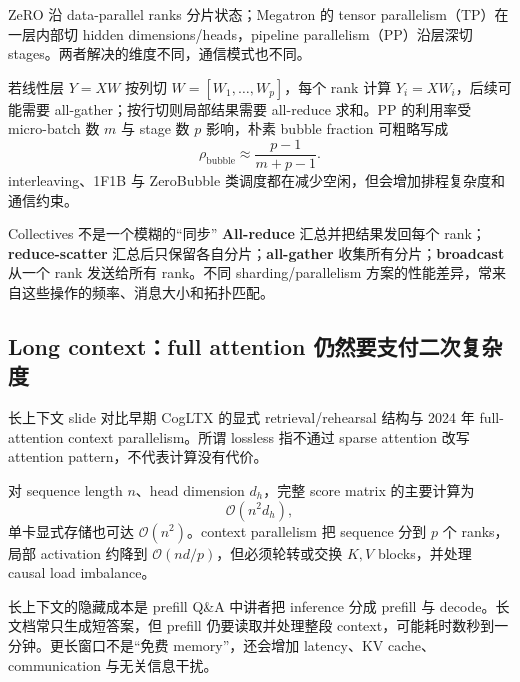 ZeRO 沿 data-parallel ranks 分片状态；Megatron 的 tensor parallelism（TP）在一层内部切 hidden dimensions/heads，pipeline parallelism（PP）沿层深切 stages。两者解决的维度不同，通信模式也不同。


若线性层 $Y=XW$ 按列切 $W=[W_1,\ldots,W_p]$，每个 rank 计算 $Y_i=XW_i$，后续可能需要 all-gather；按行切则局部结果需要 all-reduce 求和。PP 的利用率受 micro-batch 数 $m$ 与 stage 数 $p$ 影响，朴素 bubble fraction 可粗略写成
\[
\rho_{\text{bubble}}\approx \frac{p-1}{m+p-1}.
\]
interleaving、1F1B 与 ZeroBubble 类调度都在减少空闲，但会增加排程复杂度和通信约束。

\begin{knowledgebox}{Collectives 不是一个模糊的“同步”}
\textbf{All-reduce} 汇总并把结果发回每个 rank；\textbf{reduce-scatter} 汇总后只保留各自分片；\textbf{all-gather} 收集所有分片；\textbf{broadcast} 从一个 rank 发送给所有 rank。不同 sharding/parallelism 方案的性能差异，常来自这些操作的频率、消息大小和拓扑匹配。
\end{knowledgebox}


\subsection{Long context：full attention 仍然要支付二次复杂度}

长上下文 slide 对比早期 CogLTX 的显式 retrieval/rehearsal 结构与 2024 年 full-attention context parallelism。所谓 lossless 指不通过 sparse attention 改写 attention pattern，不代表计算没有代价。


对 sequence length $n$、head dimension $d_h$，完整 score matrix 的主要计算为
\[
\mathcal{O}(n^2d_h),
\]
单卡显式存储也可达 $\mathcal{O}(n^2)$。context parallelism 把 sequence 分到 $p$ 个 ranks，局部 activation 约降到 $\mathcal{O}(nd/p)$，但必须轮转或交换 $K,V$ blocks，并处理 causal load imbalance。

\begin{warningbox}{长上下文的隐藏成本是 prefill}
Q\&A 中讲者把 inference 分成 prefill 与 decode。长文档常只生成短答案，但 prefill 仍要读取并处理整段 context，可能耗时数秒到一分钟。更长窗口不是“免费 memory”，还会增加 latency、KV cache、communication 与无关信息干扰。
\end{warningbox}


